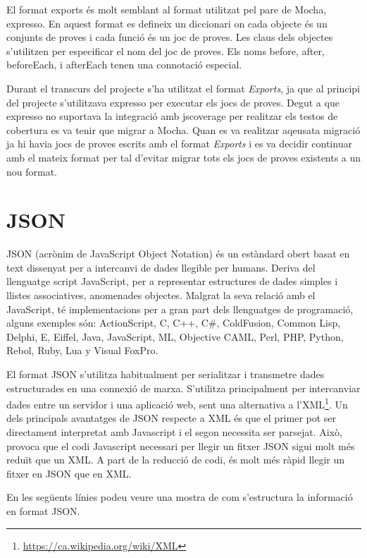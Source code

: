 El format exports és molt semblant al format utilitzat pel pare de Mocha, expresso. En aquest format es defineix un diccionari on cada objecte és un conjunts de proves i cada funció és un joc de proves. Les claus dels objectes s'utilitzen per especificar el nom del joc de proves. Els noms before, after, beforeEach, i afterEach tenen una connotació especial. 

Durant el transcurs del projecte s'ha utilitzat el format \emph{Exports}, ja que al principi del projecte s'utilitzava expresso per executar els jocs de proves. Degut a que expresso no suportava la integració amb jscoverage per realitzar els testos de cobertura es va tenir que migrar a Mocha. Quan es va realitzar aqeusata migració ja hi havia jocs de proves escrits amb el format \emph{Exports} i es va decidir continuar amb el mateix format per tal d'evitar migrar tots els jocs de proves existents a un nou format. 

\section{JSON}
\label{sec:json}

JSON (acrònim de JavaScript Object Notation) és un estàndard obert basat en text dissenyat per a intercanvi de dades llegible per humans. Deriva del llenguatge script JavaScript, per a representar estructures de dades simples i llistes associatives, anomenades objectes. Malgrat la seva relació amb el JavaScript, té implementacions per a gran part dels llenguatges de programació, alguns exemples són: ActionScript, C, C++, C\#, ColdFusion, Common Lisp, Delphi, E, Eiffel, Java, JavaScript, ML, Objective CAML, Perl, PHP, Python, Rebol, Ruby, Lua y Visual FoxPro. 

El format JSON s'utilitza habitualment per serialitzar i transmetre dades estructurades en una connexió de marxa. S'utilitza principalment per intercanviar dades entre un servidor i una aplicació web, sent una alternativa a l'XML\footnote{\url{https://ca.wikipedia.org/wiki/XML}}. Un dels principals avantatges de JSON respecte a XML és que el primer pot ser directament interpretat amb Javascript i el segon necessita ser parsejat. Això, provoca que el codi Javascript necessari per llegir un fitxer JSON sigui molt més reduït que un XML. A part de la reducció de codi, és molt més ràpid llegir un fitxer en JSON que en XML. 

En les següents línies podeu veure una mostra de com s'estructura la informació en format JSON. 

